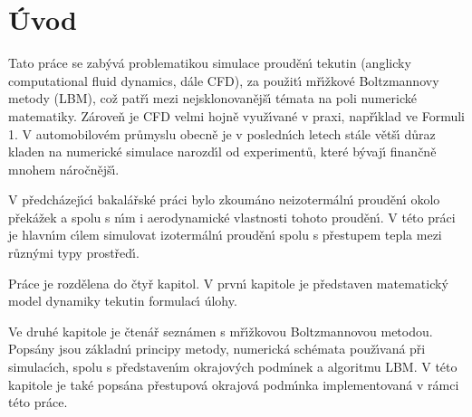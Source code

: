 \chapter*{\'{U}vod}


    Tato pr\'{a}ce se zab\'{y}v\'{a} problematikou simulace proud\v{e}n\'{\i} tekutin (anglicky computational fluid dynamics, d\'{a}le CFD), za pou\v{z}it\'{\i} m\v{r}\'{\i}\v{z}kov\'{e} Boltzmannovy metody (LBM), co\v{z} pat\v{r}\'{\i} mezi nejsklonovan\v{e}j\v{s}\'{\i} t\'{e}mata na poli numerick\'{e} matematiky. Z\'{a}rove\v{n} je CFD velmi hojn\v{e} vyu\v{z}\'{\i}van\'{e} v praxi, nap\v{r}\'{\i}klad ve Formuli 1. V automobilov\'{e}m pr\r{u}myslu obecn\v{e} je v posledn\'{\i}ch letech st\'{a}le v\v{e}t\v{s}\'{\i} d\r{u}raz kladen na numerick\'{e} simulace narozd\'{\i}l od experiment\r{u}, kter\'{e} b\'{y}vaj\'{\i} finan\v{c}n\v{e} mnohem n\'{a}ro\v{c}n\v{e}j\v{s}\'{\i}.

    V p\v{r}edch\'{a}zej\'{\i}c\'{\i} bakal\'{a}\v{r}sk\'{e} pr\'{a}ci \cite{BP_DH} bylo zkoum\'{a}no neizoterm\'{a}ln\'{\i} proud\v{e}n\'{\i} okolo p\v{r}ek\'{a}\v{z}ek a spolu s n\'{\i}m i aerodynamick\'{e} vlastnosti tohoto proud\v{e}n\'{\i}. V t\'{e}to pr\'{a}ci je hlavn\'{\i}m c\'{\i}lem simulovat izoterm\'{a}ln\'{\i} proud\v{e}n\'{\i} spolu s p\v{r}estupem tepla mezi r\r{u}zn\'{y}mi typy prost\v{r}ed\'{\i}.


    Pr\'{a}ce je rozd\v{e}lena do \v{c}ty\v{r} kapitol. V prvn\'{\i} kapitole je p\v{r}edstaven matematick\'{y} model dynamiky tekutin 
    formulac\'{\i} \'{u}lohy. 
    
    Ve druh\'{e} kapitole je \v{c}ten\'{a}\v{r} sezn\'{a}men s m\v{r}\'{\i}\v{z}kovou Boltzmannovou metodou. Pops\'{a}ny jsou z\'{a}kladn\'{\i} principy metody, numerick\'{a} sch\'{e}mata pou\v{z}\'{\i}van\'{a} p\v{r}i simulac\'{\i}ch, spolu s p\v{r}edstaven\'{\i}m okrajov\'{y}ch podm\'{\i}nek a algoritmu LBM.
    V t\'{e}to kapitole je tak\'{e} pops\'{a}na p\v{r}estupov\'{a} okrajov\'{a} podm\'{\i}nka implementovan\'{a} v r\'{a}mci t\'{e}to pr\'{a}ce. 
    
